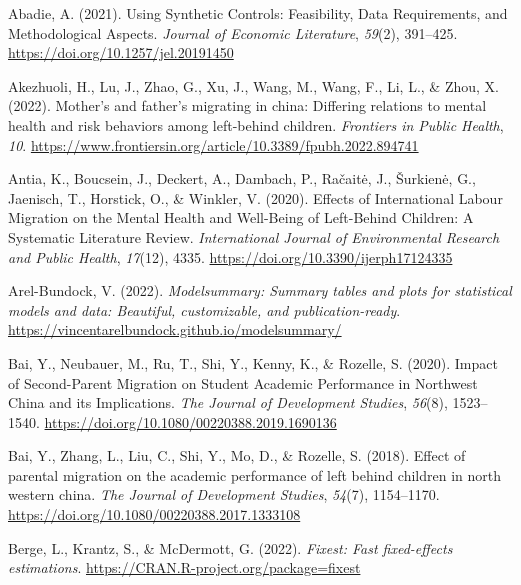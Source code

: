 \documentclass[
  man,floatsintext]{apa7}
\newlength{\cslhangindent}
\newlength{\cslentryspacingunit} %
\newenvironment{CSLReferences}[2] %
 {%
  \setlength{\parindent}{0pt}
  \ifodd #1
  \let\oldpar\par
  \def\par{\hangindent=\cslhangindent\oldpar}
  \fi
  \setlength{\parskip}{#2\cslentryspacingunit}
 }%
 {}
\begin{document}
\hypertarget{refs}{}
\begin{CSLReferences}{1}{0}
\leavevmode{}%
Abadie, A. (2021). Using Synthetic Controls: Feasibility, Data Requirements, and Methodological Aspects. \emph{Journal of Economic Literature}, \emph{59}(2), 391--425. \url{https://doi.org/10.1257/jel.20191450}

\leavevmode{}%
Akezhuoli, H., Lu, J., Zhao, G., Xu, J., Wang, M., Wang, F., Li, L., \& Zhou, X. (2022). Mother's and father's migrating in china: Differing relations to mental health and risk behaviors among left-behind children. \emph{Frontiers in Public Health}, \emph{10}. \url{https://www.frontiersin.org/article/10.3389/fpubh.2022.894741}

\leavevmode{}%
Antia, K., Boucsein, J., Deckert, A., Dambach, P., Račaitė, J., Šurkienė, G., Jaenisch, T., Horstick, O., \& Winkler, V. (2020). Effects of International Labour Migration on the Mental Health and Well-Being of Left-Behind Children: A Systematic Literature Review. \emph{International Journal of Environmental Research and Public Health}, \emph{17}(12), 4335. \url{https://doi.org/10.3390/ijerph17124335}

\leavevmode{}%
Arel-Bundock, V. (2022). \emph{Modelsummary: Summary tables and plots for statistical models and data: Beautiful, customizable, and publication-ready}. \url{https://vincentarelbundock.github.io/modelsummary/}

\leavevmode{}%
Bai, Y., Neubauer, M., Ru, T., Shi, Y., Kenny, K., \& Rozelle, S. (2020). Impact of Second-Parent Migration on Student Academic Performance in Northwest China and its Implications. \emph{The Journal of Development Studies}, \emph{56}(8), 1523--1540. \url{https://doi.org/10.1080/00220388.2019.1690136}

\leavevmode{}%
Bai, Y., Zhang, L., Liu, C., Shi, Y., Mo, D., \& Rozelle, S. (2018). Effect of parental migration on the academic performance of left behind children in north western china. \emph{The Journal of Development Studies}, \emph{54}(7), 1154--1170. \url{https://doi.org/10.1080/00220388.2017.1333108}

\leavevmode{}%
Berge, L., Krantz, S., \& McDermott, G. (2022). \emph{Fixest: Fast fixed-effects estimations}. \url{https://CRAN.R-project.org/package=fixest}


\end{CSLReferences}
\end{document}
